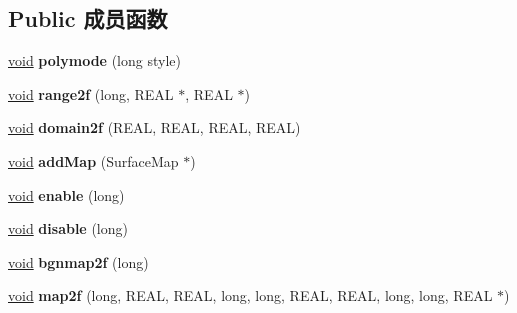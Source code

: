 \subsection*{Public 成员函数}
\begin{DoxyCompactItemize}
\item 
\mbox{\label{class_open_g_l_surface_evaluator_adf4cfb0e0e4a28a179697a09a3b39dbe}} 
\hyperlink{interfacevoid}{void} {\bfseries polymode} (long style)
\item 
\mbox{\label{class_open_g_l_surface_evaluator_a00b65d4b9643e83b75c4e7495554ba70}} 
\hyperlink{interfacevoid}{void} {\bfseries range2f} (long, R\+E\+AL $\ast$, R\+E\+AL $\ast$)
\item 
\mbox{\label{class_open_g_l_surface_evaluator_a35dea70f97384e80af562b99ad4b4ed1}} 
\hyperlink{interfacevoid}{void} {\bfseries domain2f} (R\+E\+AL, R\+E\+AL, R\+E\+AL, R\+E\+AL)
\item 
\mbox{\label{class_open_g_l_surface_evaluator_a54673939f3b5f3b94f299fbfea76149e}} 
\hyperlink{interfacevoid}{void} {\bfseries add\+Map} (Surface\+Map $\ast$)
\item 
\mbox{\label{class_open_g_l_surface_evaluator_ab53ed6019aee556b638d19bbc72ca376}} 
\hyperlink{interfacevoid}{void} {\bfseries enable} (long)
\item 
\mbox{\label{class_open_g_l_surface_evaluator_af5b244d2cd7dfe4918573ec6dd4aa5c2}} 
\hyperlink{interfacevoid}{void} {\bfseries disable} (long)
\item 
\mbox{\label{class_open_g_l_surface_evaluator_a7957d4347c4a3a16089074026284320c}} 
\hyperlink{interfacevoid}{void} {\bfseries bgnmap2f} (long)
\item 
\mbox{\label{class_open_g_l_surface_evaluator_aba99484572266a0745393f83db1af588}} 
\hyperlink{interfacevoid}{void} {\bfseries map2f} (long, R\+E\+AL, R\+E\+AL, long, long, R\+E\+AL, R\+E\+AL, long, long, R\+E\+AL $\ast$)
\item 

\end{DoxyCompactItemize}
